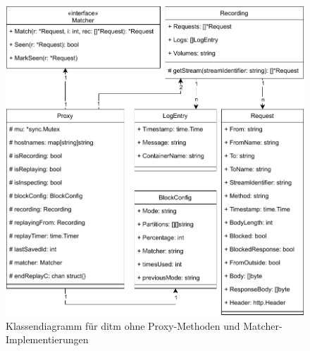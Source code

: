 \documentclass[12pt,a4paper]{report}
\begin{document}
\begin{figure}[H]
	\centering
    \includegraphics[width=\linewidth]{img/ditm-Class.pdf}
    \caption{Klassendiagramm für ditm ohne Proxy-Methoden und Matcher-Implementierungen}
    \label{fig:class}
\end{figure}
\end{document}

